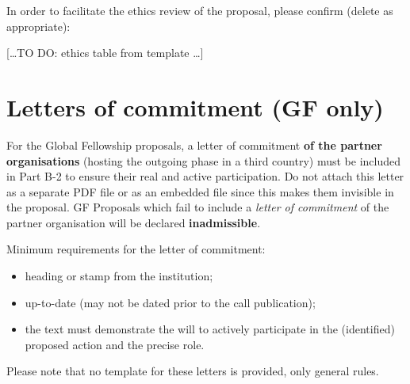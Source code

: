 In order to facilitate the ethics review of the proposal, please
confirm (delete as appropriate):

[\dots TO DO: ethics table from template \dots]

\section{Letters of commitment (GF only)}
\label{sec:letters}

For the Global Fellowship proposals, a letter of commitment
\textbf{of the partner organisations} (hosting the outgoing phase
in a third country) must be included in Part B-2 to ensure their
real and active participation.  Do not attach this letter as a
separate PDF file or as an embedded file since this makes them
invisible in the proposal. GF Proposals which fail to include a
\emph{letter of commitment} of the partner organisation will be
declared \textbf{inadmissible}.

\medskip\noindent

Minimum requirements for the letter of commitment:
\begin{itemize}
  \item heading or stamp from the institution; 
  \item up-to-date (may not be dated prior to the call
  publication);
  \item the text must demonstrate the will to actively participate
  in the (identified) proposed action and the precise role.
\end{itemize}

\medskip\noindent

Please note that no template for these letters is provided, only
general rules.
